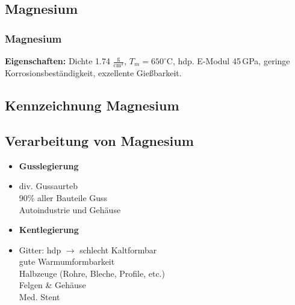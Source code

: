 \documentclass[8.5pt,twocolumn]{extarticle}
\begin{document}
    \subsection{Magnesium}
    \subsubsection{Magnesium}
    \noindent\textbf{Eigenschaften:}
    Dichte 1.74 $\mathrm{\frac{g}{cm^3}}$, $T_m=650^\circ$C, hdp.\hfill
    \textbf{}E-Modul 45\,GPa, geringe Korrosionsbeständigkeit, exzellente Gießbarkeit.
    \subsection{Kennzeichnung Magnesium}
    \subsection{Verarbeitung von Magnesium}
    \begin{minipage}[t]{0.5\columnwidth}
        \begin{itemize}[label={}, leftmargin=*, itemsep=0.01em]
            \item \textbf{Gusslegierung}
            \item div. Gussaurteb \\ 90\% aller Bauteile Guss \\ Autoindustrie und Gehäuse
        \end{itemize}
    \end{minipage}\hfill
    \begin{minipage}[t]{0.5\columnwidth}
        \begin{itemize}[label={}, leftmargin=*,  itemsep=0.01em]
            \item \textbf{Kentlegierung}
            \item Gitter: hdp $\rightarrow$ schlecht Kaltformbar \\  gute Warmumformbarkeit \\ Halbzeuge (Rohre, Bleche, Profile, etc.) \\ Felgen \& Gehäuse \\ Med. Stent
        \end{itemize} 
    \end{minipage}\hfill
\end{document}
